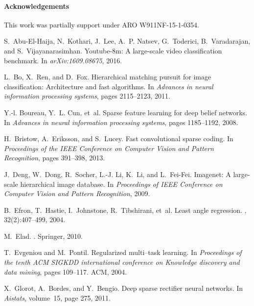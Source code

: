 \documentclass[10pt,twocolumn,letterpaper]{article}
\begin{document}
\paragraph{Acknowledgements} This work was partially support under ARO W911NF-15-1-0354.

\begin{thebibliography}{10}\itemsep=-1pt

S.~Abu-El-Haija, N.~Kothari, J.~Lee, A.~P. Natsev, G.~Toderici, B.~Varadarajan,
  and S.~Vijayanarasimhan.
\newblock Youtube-8m: A large-scale video classification benchmark.
\newblock In {\em arXiv:1609.08675}, 2016.

L.~Bo, X.~Ren, and D.~Fox.
\newblock Hierarchical matching pursuit for image classification: Architecture
  and fast algorithms.
\newblock In {\em Advances in neural information processing systems}, pages
  2115--2123, 2011.

Y.-l. Boureau, Y.~L. Cun, et~al.
\newblock Sparse feature learning for deep belief networks.
\newblock In {\em Advances in neural information processing systems}, pages
  1185--1192, 2008.

H.~Bristow, A.~Eriksson, and S.~Lucey.
\newblock Fast convolutional sparse coding.
\newblock In {\em Proceedings of the IEEE Conference on Computer Vision and
  Pattern Recognition}, pages 391--398, 2013.

J.~Deng, W.~Dong, R.~Socher, L.-J. Li, K.~Li, and L.~Fei-Fei.
\newblock Imagenet: A large-scale hierarchical image database.
\newblock In {\em {Proceedings of IEEE Conference on Computer Vision and
  Pattern Recognition}}, 2009.

B.~Efron, T.~Hastie, I.~Johnstone, R.~Tibshirani, et~al.
\newblock Least angle regression.
, 32(2):407--499, 2004.

M.~Elad.
.
\newblock Springer, 2010.

T.~Evgeniou and M.~Pontil.
\newblock Regularized multi--task learning.
\newblock In {\em Proceedings of the tenth ACM SIGKDD international conference
  on Knowledge discovery and data mining}, pages 109--117. ACM, 2004.

X.~Glorot, A.~Bordes, and Y.~Bengio.
\newblock Deep sparse rectifier neural networks.
\newblock In {\em Aistats}, volume~15, page 275, 2011.


\end{thebibliography}
\end{document}
